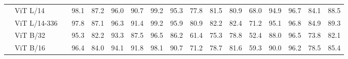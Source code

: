 \documentclass{article} \usepackage{iclr2023_conference,times}
\begin{document}
\begin{table}
{\begin{tabular}{cl|cccccccccccccc|c}
			 & ViT L/14     &  & 98.1                                       & 87.2                                        & 96.0                                          & 90.7                                    & 99.2                                       & 95.3                                       & 77.8                                        & 81.5                                      & 80.9                                   & 68.0                                        & 94.9                                    & 96.7                                       & 84.1                                        & 88.5                                        \\
			 & ViT L/14-336 &  & 97.8                                       & 87.1                                        & 96.3                                          & 91.4                                    & 99.2                                       & 95.9                                       & 80.9                                        & 82.2                                      & 82.4                                   & 71.2                                        & 95.1                                    & 96.8                                       & 84.9                                        & 89.3                                        \\ \midrule \multirow{3}{0em}{\rotatebox[origin=c]{90}{OPEN}}
			 & ViT B/32     &  & 95.3                                       & 82.2                                        & 93.3                                          & 87.5                                    & 96.5                                       & 86.2                                       & 61.4                                        & 75.3                                      & 78.8                                   & 52.4                                        & 88.0                                    & 96.5                                       & 73.8                                        & 82.1                                        \\
			 & ViT B/16     &  & 96.4                                       & 84.0                                        & 94.1                                          & 91.8                                    & 98.1                                       & 90.7                                       & 71.2                                        & 78.7                                      & 81.6                                   & 59.3                                        & 90.0                                    & 96.2                                       & 78.5                                        & 85.4                                        \\

\end{tabular}}
\end{table}
\end{document}
